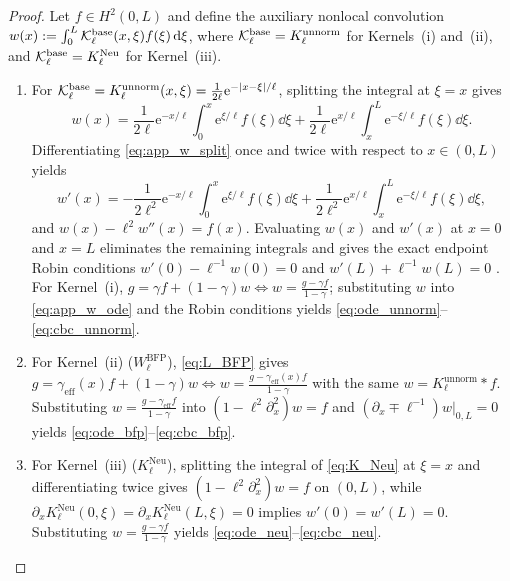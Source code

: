 \begin{proof}
Let $f \in H^2(0,L)$ and define the auxiliary nonlocal convolution $w(x) := \int_0^L \mathcal{K}_\ell^{\mathrm{base}}(x,\xi)f(\xi)\,\mathrm{d}\xi$, where $\mathcal{K}_\ell^{\mathrm{base}} = K_\ell^{\mathrm{unnorm}}$ for Kernels~(i) and~(ii), and $\mathcal{K}_\ell^{\mathrm{base}} = K_\ell^{\mathrm{Neu}}$ for Kernel~(iii).
\begin{enumerate}[label=(\alph*),leftmargin=*]
  \item For $\mathcal{K}_\ell^{\mathrm{base}} = K_\ell^{\mathrm{unnorm}}(x,\xi) = \frac{1}{2\ell}\mathrm{e}^{-|x-\xi|/\ell}$, splitting the integral at $\xi = x$ gives
  \begin{equation}\label{eq:app_w_split}
    w(x) = \frac{1}{2\ell}\mathrm{e}^{-x/\ell}\int_0^x \mathrm{e}^{\xi/\ell}f(\xi)\dd\xi + \frac{1}{2\ell}\mathrm{e}^{x/\ell}\int_x^L \mathrm{e}^{-\xi/\ell}f(\xi)\dd\xi.
  \end{equation}
  Differentiating \eqref{eq:app_w_split} once and twice with respect to $x \in (0,L)$ yields
  \begin{equation}\label{eq:app_w_ode}
    w'(x) = -\frac{1}{2\ell^2}\mathrm{e}^{-x/\ell}\int_0^x \mathrm{e}^{\xi/\ell}f(\xi)\dd\xi + \frac{1}{2\ell^2}\mathrm{e}^{x/\ell}\int_x^L \mathrm{e}^{-\xi/\ell}f(\xi)\dd\xi,
  \end{equation}
  and $w(x) - \ell^2 w''(x) = f(x)$. Evaluating $w(x)$ and $w'(x)$ at $x = 0$ and $x = L$ eliminates the remaining integrals and gives the exact endpoint Robin conditions $w'(0) - \ell^{-1}w(0) = 0$ and $w'(L) + \ell^{-1}w(L) = 0$ \cite{FernandezSaez2016,Romano2017}.
  For Kernel~(i), $g = \gamma f + (1-\gamma)w \iff w = \frac{g - \gamma f}{1-\gamma}$; substituting $w$ into \eqref{eq:app_w_ode} and the Robin conditions yields \eqref{eq:ode_unnorm}--\eqref{eq:cbc_unnorm}.
  \item For Kernel~(ii) ($W_\ell^{\mathrm{BFP}}$), \eqref{eq:L_BFP} gives $g = \gamma_{\mathrm{eff}}(x)f + (1-\gamma)w \iff w = \frac{g - \gamma_{\mathrm{eff}}(x)f}{1-\gamma}$ with the same $w = K_\ell^{\mathrm{unnorm}} * f$. Substituting $w = \frac{g - \gamma_{\mathrm{eff}}f}{1-\gamma}$ into $(1-\ell^2\partial_x^2)w = f$ and $(\partial_x \mp \ell^{-1})w\big|_{0,L} = 0$ yields \eqref{eq:ode_bfp}--\eqref{eq:cbc_bfp}.
  \item For Kernel~(iii) ($K_\ell^{\mathrm{Neu}}$), splitting the integral of \eqref{eq:K_Neu} at $\xi = x$ and differentiating twice gives $(1-\ell^2\partial_x^2)w = f$ on $(0,L)$, while $\partial_x K_\ell^{\mathrm{Neu}}(0,\xi) = \partial_x K_\ell^{\mathrm{Neu}}(L,\xi) = 0$ implies $w'(0) = w'(L) = 0$. Substituting $w = \frac{g - \gamma f}{1-\gamma}$ yields \eqref{eq:ode_neu}--\eqref{eq:cbc_neu}.

\end{enumerate}
\end{proof}

